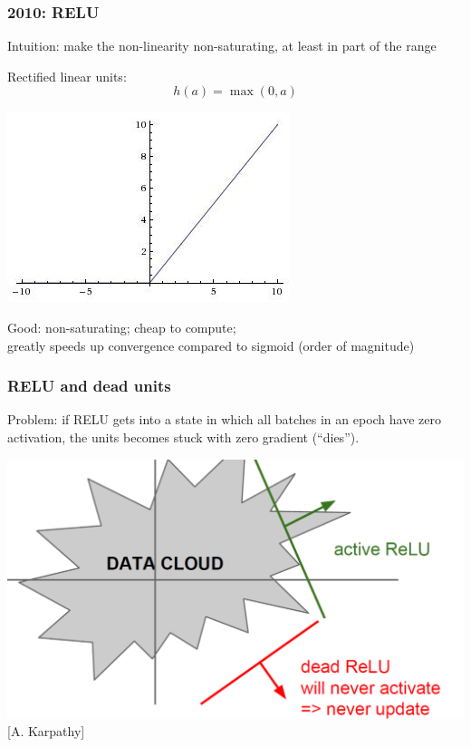 \documentclass[xcolor=dvipsnames]{beamer}
\begin{document}
\begin{frame}
  \frametitle{2010: RELU}
  \bi
\item Intuition: make the non-linearity non-saturating, at least in
  part of the range
\ei
\begin{minipage}[c]{.5\linewidth}
\bi  \item Rectified linear units: 
\[h(a)=\max(0,a)\]
\ei
\end{minipage}%
\begin{minipage}[c]{.5\linewidth}
  \includegraphics[width=.75\textwidth]{ak-relu}
\end{minipage}
\bi
\item Good: non-saturating; cheap to compute; \\
greatly speeds up convergence compared to sigmoid (order of magnitude)
\ei
\end{frame}
\begin{frame}
  \frametitle{RELU and dead units}
  \bi
\item Problem: if RELU gets into a state in which all batches in an
  epoch have zero activation, the units becomes stuck with
  zero gradient (``dies'').

\includegraphics[width=.7\textwidth]{ak-deadrelus} [A. Karpathy]

\ei
\end{frame}
\end{document}

